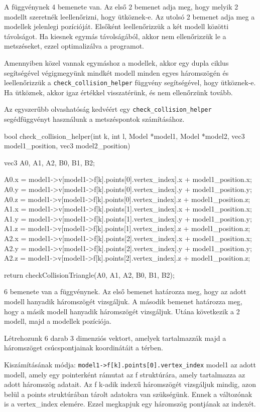 A függvénynek 4 bemenete van. Az első 2 bemenet adja meg, hogy melyik 2 modellt szeretnék leellenőrizni, hogy ütköznek-e. Az utolsó 2 bemenet adja meg a modellek jelenlegi pozícióját.
Elsőként leellenőrizzük a két modell közötti távolságot. Ha kiesnek egymás távolságából, akkor nem ellenőrizzük le a metszéseket, ezzel optimalizálva a programot. 

Amennyiben közel vannak egymáshoz a modellek, akkor egy dupla ciklus segítségével végigmegyünk mindkét modell minden egyes háromszögén és leellenőrizzük a \texttt{check\_collision\_helper} függvény segítségével, hogy ütköznek-e. Ha ütköznek, akkor igaz értékkel visszatérünk, és nem ellenőrzünk tovább.
\newpage

Az egyszerűbb olvashatóság kedvéért egy \texttt{check\_collision\_helper} segédfüggvényt használunk a metszéspontok számításához.

\begin{cpp}
bool check_collision_helper(int k, int l, Model *model1, 
Model *model2, vec3 model1_position, vec3 model2_position)
{
    vec3 A0, A1, A2, B0, B1, B2;
		
    A0.x = model1->v[model1->f[k].points[0].vertex_index].x 
    + model1_position.x;
    A0.y = model1->v[model1->f[k].points[0].vertex_index].y 
    + model1_position.y;
    A0.z = model1->v[model1->f[k].points[0].vertex_index].z 
    + model1_position.z;
    A1.x = model1->v[model1->f[k].points[1].vertex_index].x 
    + model1_position.x;
    A1.y = model1->v[model1->f[k].points[1].vertex_index].y 
    + model1_position.y;
    A1.z = model1->v[model1->f[k].points[1].vertex_index].z 
    + model1_position.z;
    A2.x = model1->v[model1->f[k].points[2].vertex_index].x 
    + model1_position.x;
    A2.y = model1->v[model1->f[k].points[2].vertex_index].y 
    + model1_position.y;
    A2.z = model1->v[model1->f[k].points[2].vertex_index].z 
    + model1_position.z;

    return checkCollisionTriangle(A0, A1, A2, B0, B1, B2);
}
\end{cpp}

6 bemenete van a függvénynek. Az első bemenet határozza meg, hogy az adott modell hanyadik háromszögét vizsgáljuk. A második bemenet határozza meg, hogy a másik modell hanyadik háromszögét vizsgáljuk. Utána következik a 2 modell, majd a modellek pozíciója.

Létrehozunk 6 darab 3 dimenziós vektort, amelyek tartalmazzák majd a háromszöget csúcspontjainak koordinátáit a térben. 

Kiszámításának módja: \texttt{model1->f[k].points[0].vertex\_index}
model1 az adott modell, amely egy pointerként rámutat az f struktúrára, amely tartalmazza az adott háromszög adatait. Az f k-adik indexű háromszögét vizsgáljuk mindig, azon belül a points struktúrában tárolt adatokra van szükségünk. Ennek a változónak is a vertex\_index elemére. Ezzel megkapjuk egy háromszög pontjának az indexét.

